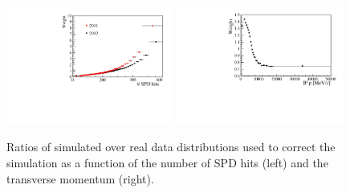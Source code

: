 \begin{figure}[h!]
\centering
\includegraphics[width=0.49\textwidth]{RKst/figs/nspd_w.pdf}
\includegraphics[width=0.49\textwidth]{RKst/figs/bpt_w.pdf}
\caption{ Ratios of simulated over real data distributions used to correct the simulation
as a function of the number of SPD hits (left) and the \Bz transverse momentum (right). }
\label{fig:b0pt_nSPD_ratios}
\end{figure}



